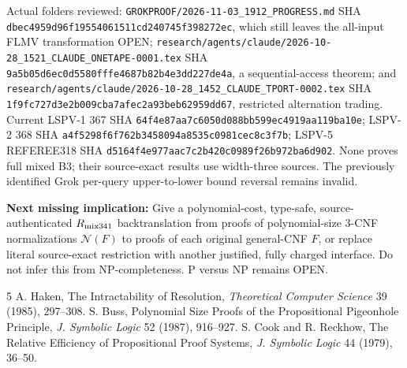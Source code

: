 \documentclass[11pt]{article}
\begin{document}
Actual folders reviewed: \texttt{GROKPROOF/2026-11-03\_1912\_PROGRESS.md} SHA \texttt{dbec4959d96f19554061511cd240745f398272ec}, which still leaves the all-input FLMV transformation OPEN; \texttt{research/agents/claude/2026-10-28\_1521\_CLAUDE\_ONETAPE-0001.tex} SHA \texttt{9a5b05d6ec0d5580fffe4687b82b4e3dd227de4a}, a sequential-access theorem; and \texttt{research/agents/claude/2026-10-28\_1452\_CLAUDE\_TPORT-0002.tex} SHA \texttt{1f9fc727d3e2b009cba7afec2a93beb62959dd67}, restricted alternation trading. Current LSPV-1 367 SHA \texttt{64f4e87aa7c6050d088bb599ec4919aa119ba10e}; LSPV-2 368 SHA \texttt{a4f5298f6f762b3458094a8535c0981cec8c3f7b}; LSPV-5 REFEREE318 SHA \texttt{d5164f4e977aac7c2b420c0989f26b972ba6d902}. None proves full mixed B3; their source-exact results use width-three sources. The previously identified Grok per-query upper-to-lower bound reversal remains invalid.

\noindent\textbf{Next missing implication:} Give a polynomial-cost, type-safe, source-authenticated $R_{\rm mix341}$ backtranslation from proofs of polynomial-size 3-CNF normalizations $\mathcal N(F)$ to proofs of each original general-CNF $F$, or replace literal source-exact restriction with another justified, fully charged interface. Do not infer this from NP-completeness. P versus NP remains OPEN.

\begin{thebibliography}{5}
 A. Haken, The Intractability of Resolution, \emph{Theoretical Computer Science} 39 (1985), 297--308.
 S. Buss, Polynomial Size Proofs of the Propositional Pigeonhole Principle, \emph{J. Symbolic Logic} 52 (1987), 916--927.
 S. Cook and R. Reckhow, The Relative Efficiency of Propositional Proof Systems, \emph{J. Symbolic Logic} 44 (1979), 36--50.
\end{thebibliography}
\end{document}
